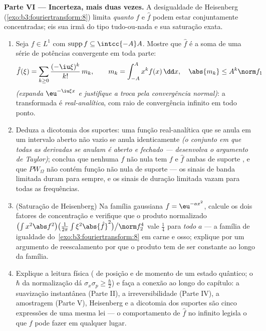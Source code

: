 \begin{problem}[{Problema de fim de semana --- $\partial_tu =
\partial^2_{xx}u$, resolvida de
ponta a ponta}]
\medskip
\noindent\textbf{Parte VI --- Incerteza, mais duas vezes.} A
desigualdade de Heisenberg (\cref{exo:b3:fouriertransform:8}) limita \emph{quanto} $f$
e $\hat f$ podem estar conjuntamente concentradas; eis sua irmã do
tipo tudo-ou-nada e sua saturação exata.
\begin{enumerate}[resume]
  \item Seja $f \in L^1$ com $\operatorname{supp}f \subseteq
        \intcc{-A}A$. Mostre que $\hat f$ é a soma de uma
        série de potências convergente em toda parte:
        \[
        \hat f(\xi) = \sum_{k\geq0}\frac{(-\iu\xi)^k}{k!}
        \,m_k, \qquad m_k = \int_{-A}^{A}x^kf(x)\,\dd x,
        \quad \abs{m_k} \leq A^k\norm f_1
        \]
        \emph{(expanda $\eu^{-\iu\xi x}$ e justifique a troca pela convergência
        normal)}: a transformada é \emph{real-analítica}, com raio de
        convergência infinito em todo ponto.
  \item Deduza a dicotomia dos suportes: uma função real-analítica que
        se anula em um intervalo aberto não vazio se anula
        identicamente \emph{(o conjunto em que todas as derivadas se
        anulam é aberto e fechado --- desenvolva o argumento de
        Taylor)}; conclua que nenhuma $f$ não nula tem $f$ e
        $\hat f$ ambas de suporte , e que $PW_\Omega$ não contém
        função não nula de suporte  --- os sinais de banda
        limitada duram para sempre, e os sinais de duração limitada
        vazam para todas as frequências.
  \item (Saturação de Heisenberg) Na família gaussiana $f
        = \eu^{-ax^2}$, calcule os
        dois fatores de concentração e verifique que o produto
        normalizado $\bigl(\int x^2\abs f^2\bigr)\bigl(\frac1{2\pi}\int
        \xi^2\abs{\hat f}^2\bigr)\big/\norm f_2^4$ vale $\frac14$ para \emph{todo} $a$ --- a
        família de igualdade do~\cref{exo:b3:fouriertransform:8} em carne e osso; explique
        por um argumento de reescalamento por que o produto tem de ser
        constante ao longo da família.
  \item Explique a leitura física ( de posição e de momento
        de um estado quântico; o $\hbar$ da normalização dá $\sigma_x\sigma_p \geq
        \frac\hbar2$) e
        faça a conexão ao longo do capítulo: a suavização instantânea
        (Parte II), a irreversibilidade (Parte IV), a amostragem (Parte
        V), Heisenberg e a dicotomia dos suportes são cinco expressões
        de uma mesma lei --- o comportamento de $\hat f$ no infinito
        legisla o que $f$ pode fazer em qualquer lugar.
\end{enumerate}


\end{problem}
